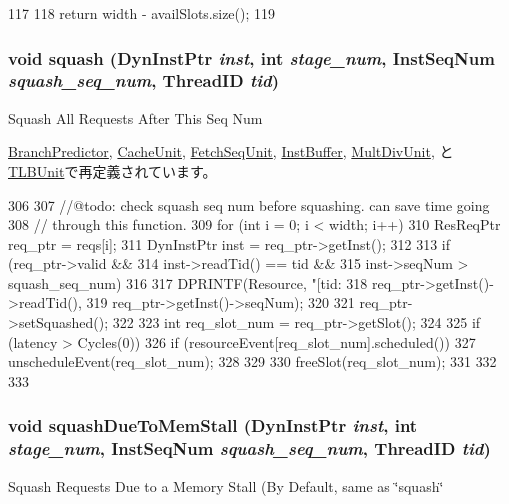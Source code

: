 \begin{DoxyCode}
117 {
118     return width - availSlots.size();
119 }
\end{DoxyCode}
\hypertarget{classResource_a52235c5e3d912452f254dc45f1496fd2}{
\subsubsection[{squash}]{\setlength{\rightskip}{0pt plus 5cm}void squash ({\bf DynInstPtr} {\em inst}, \/  int {\em stage\_\-num}, \/  {\bf InstSeqNum} {\em squash\_\-seq\_\-num}, \/  {\bf ThreadID} {\em tid})}}
\label{classResource_a52235c5e3d912452f254dc45f1496fd2}
Squash All Requests After This Seq Num 

\hyperlink{classBranchPredictor_a52235c5e3d912452f254dc45f1496fd2}{BranchPredictor}, \hyperlink{classCacheUnit_a52235c5e3d912452f254dc45f1496fd2}{CacheUnit}, \hyperlink{classFetchSeqUnit_a48e371fe43e53aebbe5b2b2afc5aa8e3}{FetchSeqUnit}, \hyperlink{classInstBuffer_a52235c5e3d912452f254dc45f1496fd2}{InstBuffer}, \hyperlink{classMultDivUnit_a52235c5e3d912452f254dc45f1496fd2}{MultDivUnit}, と \hyperlink{classTLBUnit_a52235c5e3d912452f254dc45f1496fd2}{TLBUnit}で再定義されています。


\begin{DoxyCode}
306 {
307     //@todo: check squash seq num before squashing. can save time going
308     //       through this function.
309     for (int i = 0; i < width; i++) {
310         ResReqPtr req_ptr = reqs[i];
311         DynInstPtr inst = req_ptr->getInst();
312 
313         if (req_ptr->valid &&
314             inst->readTid() == tid &&
315             inst->seqNum > squash_seq_num) {
316 
317             DPRINTF(Resource, "[tid:%
318                     req_ptr->getInst()->readTid(),
319                     req_ptr->getInst()->seqNum);
320 
321             req_ptr->setSquashed();
322 
323             int req_slot_num = req_ptr->getSlot();
324 
325             if (latency > Cycles(0)) {
326                 if (resourceEvent[req_slot_num].scheduled())
327                     unscheduleEvent(req_slot_num);
328             }
329 
330             freeSlot(req_slot_num);
331         }
332     }
333 }
\end{DoxyCode}
\hypertarget{classResource_ae2d6fba25ece343caad6eb029a4a3b5b}{
\subsubsection[{squashDueToMemStall}]{\setlength{\rightskip}{0pt plus 5cm}void squashDueToMemStall ({\bf DynInstPtr} {\em inst}, \/  int {\em stage\_\-num}, \/  {\bf InstSeqNum} {\em squash\_\-seq\_\-num}, \/  {\bf ThreadID} {\em tid})}}
\label{classResource_ae2d6fba25ece343caad6eb029a4a3b5b}
Squash Requests Due to a Memory Stall (By Default, same as \char`\"{}squash\char`\"{} 

